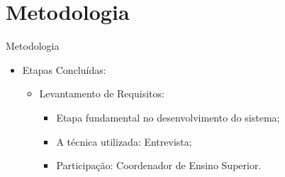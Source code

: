 \section{Metodologia}

\begin{frame}{Metodologia}
    \begin{itemize}
        \item Etapas Concluídas: \vspace{0.5cm}
              \begin{itemize}
                  \item Levantamento de Requisitos: \vspace{0.5cm}
                        \begin{itemize}
                            \item Etapa fundamental no desenvolvimento do sistema; \vspace{0.25cm}
                            \item A técnica utilizada: Entrevista; \vspace{0.25cm}
                            \item Participação: Coordenador de Ensino Superior. \vspace{0.25cm}
                        \end{itemize}
              \end{itemize}
    \end{itemize}
\end{frame}


